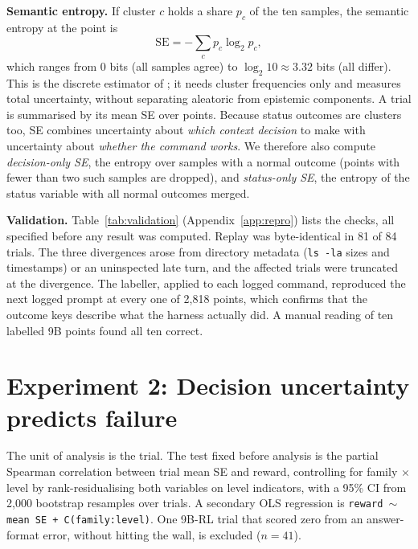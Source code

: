 \documentclass{article}
\newcommand{\SE}{\mathrm{SE}}
\begin{document}
\textbf{Semantic entropy.} If cluster $c$ holds a share $p_c$ of the ten samples, the semantic entropy at the point is
\begin{equation}
  \SE = -\sum_c p_c \log_2 p_c ,
\end{equation}
which ranges from 0 bits (all samples agree) to $\log_2 10 \approx 3.32$ bits (all differ).
This is the discrete estimator of \citet{farquhar2024detecting}; it needs cluster frequencies only and measures total uncertainty, without separating aleatoric from epistemic components.
A trial is summarised by its mean SE over points.
Because status outcomes are clusters too, SE combines uncertainty about \emph{which context decision} to make with uncertainty about \emph{whether the command works}.
We therefore also compute \emph{decision-only SE}, the entropy over samples with a normal outcome (points with fewer than two such samples are dropped), and \emph{status-only SE}, the entropy of the status variable with all normal outcomes merged.

\textbf{Validation.} Table~\ref{tab:validation} (Appendix~\ref{app:repro}) lists the checks, all specified before any result was computed.
Replay was byte-identical in 81 of 84 trials.
The three divergences arose from directory metadata (\texttt{ls -la} sizes and timestamps) or an uninspected late turn, and the affected trials were truncated at the divergence.
The labeller, applied to each logged command, reproduced the next logged prompt at every one of 2{,}818 points, which confirms that the outcome keys describe what the harness actually did.
A manual reading of ten labelled 9B points found all ten correct.



\section{Experiment 2: Decision uncertainty predicts failure}
\label{sec:exp2}

The unit of analysis is the trial.
The test fixed before analysis is the partial Spearman correlation between trial mean SE and reward, controlling for family $\times$ level by rank-residualising both variables on level indicators, with a 95\% CI from 2{,}000 bootstrap resamples over trials.
A secondary OLS regression is \texttt{reward $\sim$ mean SE + C(family:level)}.
One 9B-RL trial that scored zero from an answer-format error, without hitting the wall, is excluded ($n=41$).
\end{document}
